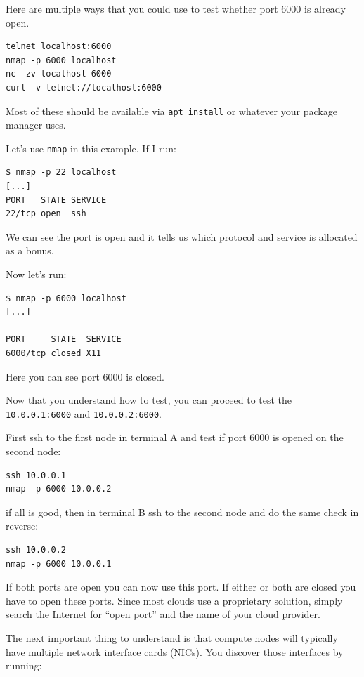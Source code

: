 \documentclass[
]{report}
\begin{document}
Here are multiple ways that you could use to test whether port 6000 is
already open.

\begin{verbatim}
telnet localhost:6000
nmap -p 6000 localhost
nc -zv localhost 6000
curl -v telnet://localhost:6000
\end{verbatim}

Most of these should be available via \texttt{apt\ install} or whatever
your package manager uses.

Let's use \texttt{nmap} in this example. If I run:

\begin{verbatim}
$ nmap -p 22 localhost
[...]
PORT   STATE SERVICE
22/tcp open  ssh
\end{verbatim}

We can see the port is open and it tells us which protocol and service
is allocated as a bonus.

Now let's run:

\begin{verbatim}
$ nmap -p 6000 localhost
[...]

PORT     STATE  SERVICE
6000/tcp closed X11
\end{verbatim}

Here you can see port 6000 is closed.

Now that you understand how to test, you can proceed to test the
\texttt{10.0.0.1:6000} and \texttt{10.0.0.2:6000}.

First ssh to the first node in terminal A and test if port 6000 is
opened on the second node:

\begin{verbatim}
ssh 10.0.0.1
nmap -p 6000 10.0.0.2
\end{verbatim}

if all is good, then in terminal B ssh to the second node and do the
same check in reverse:

\begin{verbatim}
ssh 10.0.0.2
nmap -p 6000 10.0.0.1
\end{verbatim}

If both ports are open you can now use this port. If either or both are
closed you have to open these ports. Since most clouds use a proprietary
solution, simply search the Internet for ``open port'' and the name of
your cloud provider.

The next important thing to understand is that compute nodes will
typically have multiple network interface cards (NICs). You discover
those interfaces by running:
\end{document}
